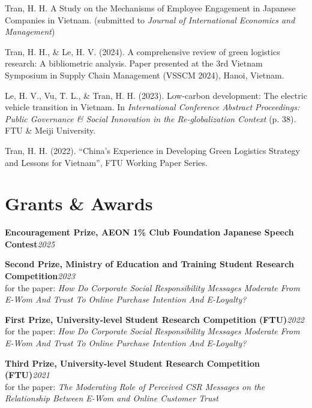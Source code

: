 \documentclass[10.5pt]{article}
\begin{document}
\begin{enumerate}[label={[\arabic*]}]

\item Tran, H. H. A Study on the Mechanisms of Employee Engagement in Japanese Companies in Vietnam. (submitted to \textit{Journal of International Economics and Management})

\item Tran, H. H., \& Le, H. V. (2024). A comprehensive review of green logistics research: A bibliometric analysis. Paper presented at the 3rd Vietnam Symposium in Supply Chain Management (VSSCM 2024), Hanoi, Vietnam.

\item Le, H. V., Vu, T. L., \& Tran, H. H. (2023). Low-carbon development: The electric vehicle transition in Vietnam. In \textit{International Conference Abstract Proceedings: Public Governance \& Social Innovation in the Re-globalization Context} (p. 38). FTU \& Meiji University.

\item Tran, H. H. (2022). ``China's Experience in Developing Green Logistics Strategy and Lessons for Vietnam'', FTU Working Paper Series.

\end{enumerate}


\section{Grants \& Awards}

\textbf{Encouragement Prize, AEON 1\% Club Foundation Japanese Speech Contest}\hfill \emph{2025}

\textbf{Second Prize, Ministry of Education and Training Student Research Competition}\hfill \emph{2023}\\
for the paper: \textit{How Do Corporate Social Responsibility Messages Moderate From E-Wom And Trust To Online Purchase Intention And E-Loyalty?}

\textbf{First Prize, University-level Student Research Competition (FTU)}\hfill \emph{2022}\\
for the paper: \textit{How Do Corporate Social Responsibility Messages Moderate From E-Wom And Trust To Online Purchase Intention And E-Loyalty?}

\textbf{Third Prize, University-level Student Research Competition (FTU)}\hfill \emph{2021}\\
for the paper: \textit{The Moderating Role of Perceived CSR Messages on the Relationship Between E-Wom and Online Customer Trust}
\end{document}

